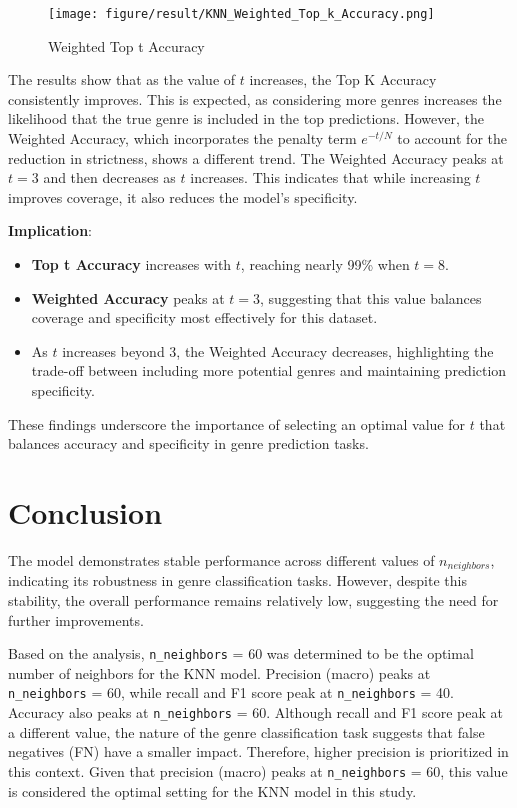 \documentclass[times, twocolumn]{article}
\begin{document}
\begin{figure}[H]
    \centering
    \texttt{[image: figure/result/KNN\_Weighted\_Top\_k\_Accuracy.png]}
    \caption{Weighted Top t Accuracy}
    \label{fig:weighted_top_t_accuracy}
\end{figure}

The results show that as the value of $t$ increases, the Top K Accuracy consistently improves. This is expected, as considering more genres increases the likelihood that the true genre is included in the top predictions. However, the Weighted Accuracy, which incorporates the penalty term $e^{-t/N}$ to account for the reduction in strictness, shows a different trend. The Weighted Accuracy peaks at $t = 3$ and then decreases as $t$ increases. This indicates that while increasing $t$ improves coverage, it also reduces the model's specificity.

\textbf{Implication}:
\begin{itemize}
    \item \textbf{Top t Accuracy} increases with $t$, reaching nearly 99\% when $t = 8$.
    \item \textbf{Weighted Accuracy} peaks at $t = 3$, suggesting that this value balances coverage and specificity most effectively for this dataset.
    \item As $t$ increases beyond 3, the Weighted Accuracy decreases, highlighting the trade-off between including more potential genres and maintaining prediction specificity.
\end{itemize}

These findings underscore the importance of selecting an optimal value for $t$ that balances accuracy and specificity in genre prediction tasks.

\section{Conclusion}
The model demonstrates stable performance across different values of $n_{neighbors}$, indicating its robustness in genre classification tasks. However, despite this stability, the overall performance remains relatively low, suggesting the need for further improvements.

Based on the analysis, \verb|n_neighbors| = 60 was determined to be the optimal number of neighbors for the KNN model. Precision (macro) peaks at \verb|n_neighbors| = 60, while recall and F1 score peak at \verb|n_neighbors| = 40. Accuracy also peaks at \verb|n_neighbors| = 60. Although recall and F1 score peak at a different value, the nature of the genre classification task suggests that false negatives (FN) have a smaller impact. Therefore, higher precision is prioritized in this context. Given that precision (macro) peaks at \verb|n_neighbors| = 60, this value is considered the optimal setting for the KNN model in this study.
\end{document}
